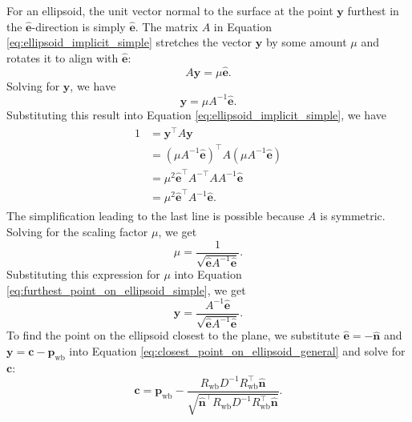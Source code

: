 \documentclass[]{article}
\newcommand{\transpose}{^{\top}}
\newcommand{\colvec}[1]{\mathbf{#1}}
\theoremstyle{definition}
\theoremstyle{remark}
\begin{document}
For an ellipsoid, the unit vector normal to the surface at the point $\colvec{y}$ furthest in the $\hat{\colvec{e}}$-direction is simply $\hat{\colvec{e}}$.
The matrix $A$ in Equation \eqref{eq:ellipsoid_implicit_simple} stretches the vector $\colvec{y}$ by some amount $\mu$ and rotates it to align with $\hat{\colvec{e}}$:
\begin{equation}
	A\colvec{y} = \mu \hat{\colvec{e}}.
\end{equation}
Solving for $\colvec{y}$, we have
\begin{equation}\label{eq:furthest_point_on_ellipsoid_simple}
	\colvec{y} = \mu A^{-1}\hat{\colvec{e}}.
\end{equation}
Substituting this result into Equation \eqref{eq:ellipsoid_implicit_simple}, we have
\begin{align*}
	\begin{split}
		1 &= \colvec{y}\transpose A \colvec{y}\\
		&= \left(\mu A^{-1}\hat{\colvec{e}}\right)\transpose A \left(\mu A^{-1}\hat{\colvec{e}}\right)\\
		&= \mu^2 \hat{\colvec{e}}\transpose A^{-\top} A A^{-1} \hat{\colvec{e}}\\
		&= \mu^2 \hat{\colvec{e}}\transpose A^{-1} \hat{\colvec{e}}.
	\end{split}
\end{align*}
The simplification leading to the last line is possible because $A$ is symmetric.
Solving for the scaling factor $\mu$, we get
\begin{equation}
	\mu = \frac{1}{\sqrt{\hat{\colvec{e}}A^{-1}\hat{\colvec{e}}}}.
\end{equation}
Substituting this expression for $\mu$ into Equation \eqref{eq:furthest_point_on_ellipsoid_simple}, we get
\begin{equation}\label{eq:closest_point_on_ellipsoid_general}
	\colvec{y} = \frac{A^{-1}\hat{\colvec{e}}}{\sqrt{\hat{\colvec{e}}A^{-1}\hat{\colvec{e}}}}.
\end{equation}
To find the point on the ellipsoid closest to the plane, we substitute $\hat{\colvec{e}} = -\hat{\colvec{n}}$ and $\colvec{y} = \colvec{c} - \colvec{p}_\mathrm{wb}$ into Equation \eqref{eq:closest_point_on_ellipsoid_general} and solve for $\colvec{c}$:
\begin{equation}\label{eq:closest_point_on_ellipsoid_Twb}
	\colvec{c} = \colvec{p}_\mathrm{wb} - \frac{R_\mathrm{wb} D^{-1} R_\mathrm{wb}\transpose \hat{\colvec{n}}}{\sqrt{\hat{\colvec{n}}\transpose R_\mathrm{wb} D^{-1} R_\mathrm{wb}\transpose \hat{\colvec{n}}}}.
\end{equation}
\end{document}
